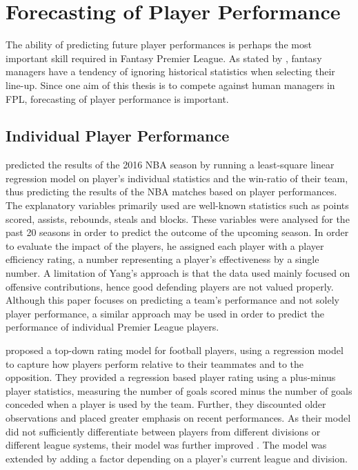 \section{Forecasting of Player Performance} \label{Forecasting_of_future_performance}

The ability of predicting future player performances is perhaps the most important skill required in Fantasy Premier League. As stated by \cite{Smith}, fantasy managers have a tendency of ignoring historical statistics when selecting their line-up. Since one aim of this thesis is to compete against human managers in FPL, forecasting of player performance is important. 

\subsection{Individual Player Performance} \label{Forecasting_of_player_performance}

\cite{Yang} predicted the results of the 2016 NBA season by running a least-square linear regression model on player's individual statistics and the win-ratio of their team, thus predicting the results of the NBA matches based on player performances. The explanatory variables primarily used are well-known statistics such as points scored, assists, rebounds, steals and blocks. These variables were analysed for the past 20 seasons in order to predict the outcome of the upcoming season. In order to evaluate the impact of the players, he assigned each player with a player efficiency rating, a number representing a player's effectiveness by a single number. A limitation of Yang's approach is that the data used mainly focused on offensive contributions, hence good defending players are not valued properly. Although this paper focuses on predicting a team's performance and not solely player performance, a similar approach may be used in order to predict the performance of individual Premier League players. 

\newpar

\cite{Hvattum_2015} proposed a top-down rating model for football players, using a regression model to capture how players perform relative to their teammates and to the opposition. They provided a regression based player rating using a plus-minus player statistics, measuring the number of goals scored minus the number of goals conceded when a player is used by the team. Further, they discounted older observations and placed greater emphasis on recent performances. As their model did not sufficiently differentiate between players from different divisions or different league systems, their model was further improved \citep{Hvattum_2017}. The model was extended by adding a factor depending on a player's current league and division. 

